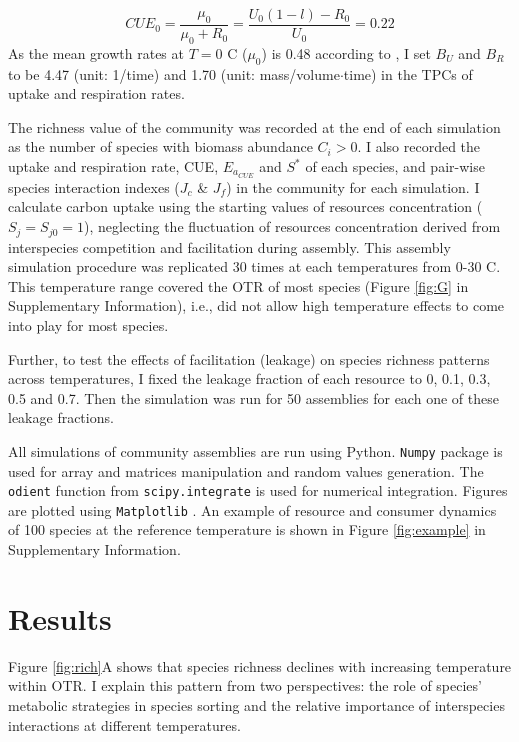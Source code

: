 \documentclass[11pt, a4paper]{article}
\begin{document}
\begin{spacing}{1.5}
\begin{equation*}
    CUE_0 = \frac{\mu_0}{\mu_0 + R_0} = \frac{U_0(1-l) - R_0}{U_0} = 0.22
\end{equation*}
As the mean growth rates at $T = 0$ \textdegree C ($\mu_0$) is 0.48 according to \cite{smith2019community}, I set $B_U$ and $B_R$ to be 4.47 (unit: 1/time) and 1.70 (unit: mass/volume$\cdot$time) in the TPCs of uptake and respiration rates. 

The richness value of the community was recorded at the end of each simulation as the number of species with biomass abundance $C_i > 0$. I also recorded the uptake and respiration rate, CUE, $E_{a_{CUE}}$ and $S^*$ of each species, and pair-wise species interaction indexes ($J_c$ \& $J_f$) in the community for each simulation. I calculate carbon uptake using the starting values of resources concentration ($S_j = S_{j0} = 1$), neglecting the fluctuation of resources concentration derived from interspecies competition and facilitation during assembly. This assembly simulation procedure was replicated 30 times at each temperatures from 0-30 \textdegree C. This temperature range covered the OTR of most species (Figure \ref{fig:G} in Supplementary Information), i.e., did not allow high temperature effects to come into play for most species. 

Further, to test the effects of facilitation (leakage) on species richness patterns across temperatures, I fixed the leakage fraction of each resource to 0, 0.1, 0.3, 0.5 and 0.7. Then the simulation was run for 50 assemblies for each one of these leakage fractions. 

All simulations of community assemblies are run using Python. \texttt{Numpy} package \citep{harris2020array} is used for array and matrices manipulation and random values generation. The \texttt{odient} function from \texttt{scipy.integrate} \citep{virtanen2020scipy} is used for numerical integration. Figures are plotted using \texttt{Matplotlib} \citep{Hunter:2007}. An example of resource and consumer dynamics of 100 species at the reference temperature is shown in Figure \ref{fig:example} in Supplementary Information. 

\section{Results}

Figure \ref{fig:rich}A shows that species richness declines with increasing temperature within OTR. I explain this pattern from two perspectives: the role of species' metabolic strategies in species sorting and the relative importance of interspecies interactions at different temperatures.


\end{spacing}
\end{document}
